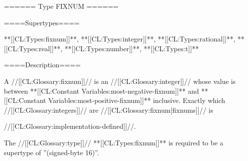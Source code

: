 ====== Type FIXNUM ======

====Supertypes====

**[[CL:Types:fixnum]]**, **[[CL:Types:integer]]**, **[[CL:Types:rational]]**, **[[CL:Types:real]]**, **[[CL:Types:number]]**, **[[CL:Types:t]]**

====Description====

A //[[CL:Glossary:fixnum]]// is an //[[CL:Glossary:integer]]// whose value is between **[[CL:Constant Variables:most-negative-fixnum]]** and **[[CL:Constant Variables:most-positive-fixnum]]** inclusive. Exactly which //[[CL:Glossary:integers]]// are //[[CL:Glossary:fixnum|fixnums]]// is

//[[CL:Glossary:implementation-defined]]//.

The //[[CL:Glossary:type]]// **[[CL:Types:fixnum]]** is required to be a supertype of ''(signed-byte 16)''.

 
